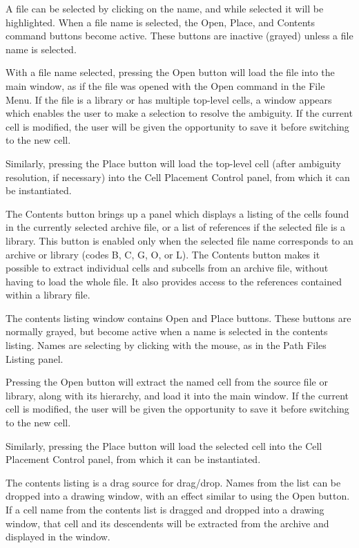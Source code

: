A file can be selected by clicking on the name, and while selected it
will be highlighted.  When a file name is selected, the {\cb Open},
{\cb Place}, and {\cb Contents} command buttons become active.  These
buttons are inactive (grayed) unless a file name is selected.

With a file name selected, pressing the {\cb Open} button will load
the file into the main window, as if the file was opened with the {\cb
Open} command in the {\cb File Menu}.  If the file is a library or has
multiple top-level cells, a window appears which enables the user to
make a selection to resolve the ambiguity.  If the current cell is
modified, the user will be given the opportunity to save it before
switching to the new cell.

Similarly, pressing the {\cb Place} button will load the top-level
cell (after ambiguity resolution, if necessary) into the {\cb Cell
Placement Control} panel, from which it can be instantiated.

The {\cb Contents} button brings up a panel which displays a listing
of the cells found in the currently selected archive file, or a list
of references if the selected file is a library.  This button is
enabled only when the selected file name corresponds to an archive or
library (codes B, C, G, O, or L).  The {\cb Contents} button makes it
possible to extract individual cells and subcells from an archive
file, without having to load the whole file.  It also provides access
to the references contained within a library file.

The contents listing window contains {\cb Open} and {\cb Place}
buttons.  These buttons are normally grayed, but become active when a
name is selected in the contents listing.  Names are selecting by
clicking with the mouse, as in the {\cb Path Files Listing} panel.

Pressing the {\cb Open} button will extract the named cell from the
source file or library, along with its hierarchy, and load it into the
main window.  If the current cell is modified, the user will be given
the opportunity to save it before switching to the new cell.

Similarly, pressing the {\cb Place} button will load the selected
cell into the {\cb Cell Placement Control} panel, from which it can be
instantiated.

The contents listing is a drag source for drag/drop.  Names from the
list can be dropped into a drawing window, with an effect similar to
using the {\cb Open} button.  If a cell name from the contents list is
dragged and dropped into a drawing window, that cell and its
descendents will be extracted from the archive and displayed in the
window.

